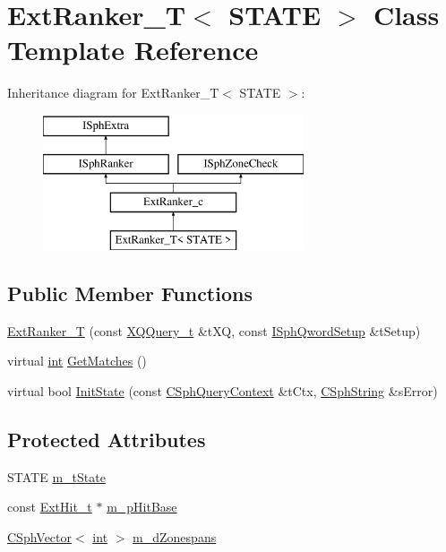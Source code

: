 \hypertarget{classExtRanker__T}{\section{Ext\-Ranker\-\_\-\-T$<$ S\-T\-A\-T\-E $>$ Class Template Reference}
\label{classExtRanker__T}
}
Inheritance diagram for Ext\-Ranker\-\_\-\-T$<$ S\-T\-A\-T\-E $>$\-:\begin{figure}[H]
\begin{center}
\leavevmode
\includegraphics[height=4.000000cm]{classExtRanker__T}
\end{center}
\end{figure}
\subsection*{Public Member Functions}
\begin{DoxyCompactItemize}
\item 
\hyperlink{classExtRanker__T_a6e41a9717808fd0e581272ce1c3f17ce}{Ext\-Ranker\-\_\-\-T} (const \hyperlink{structXQQuery__t}{X\-Q\-Query\-\_\-t} \&t\-X\-Q, const \hyperlink{classISphQwordSetup}{I\-Sph\-Qword\-Setup} \&t\-Setup)
\item 
virtual \hyperlink{sphinxexpr_8cpp_a4a26e8f9cb8b736e0c4cbf4d16de985e}{int} \hyperlink{classExtRanker__T_a926402ffb354feeec6ce6c02424cba82}{Get\-Matches} ()
\item 
virtual bool \hyperlink{classExtRanker__T_af1f9241b079426b28f4e44f7d4099972}{Init\-State} (const \hyperlink{classCSphQueryContext}{C\-Sph\-Query\-Context} \&t\-Ctx, \hyperlink{structCSphString}{C\-Sph\-String} \&s\-Error)
\end{DoxyCompactItemize}
\subsection*{Protected Attributes}
\begin{DoxyCompactItemize}
\item 
S\-T\-A\-T\-E \hyperlink{classExtRanker__T_a4b11599de85f4a4c4c2215b83b1c32ec}{m\-\_\-t\-State}
\item 
const \hyperlink{structExtHit__t}{Ext\-Hit\-\_\-t} $\ast$ \hyperlink{classExtRanker__T_ae4e04420ed78cb0e82ee8d4e48de87b3}{m\-\_\-p\-Hit\-Base}
\item 
\hyperlink{classCSphVector}{C\-Sph\-Vector}$<$ \hyperlink{sphinxexpr_8cpp_a4a26e8f9cb8b736e0c4cbf4d16de985e}{int} $>$ \hyperlink{classExtRanker__T_ab50730851677755c1067bfc4b967e057}{m\-\_\-d\-Zonespans}
\end{DoxyCompactItemize}
